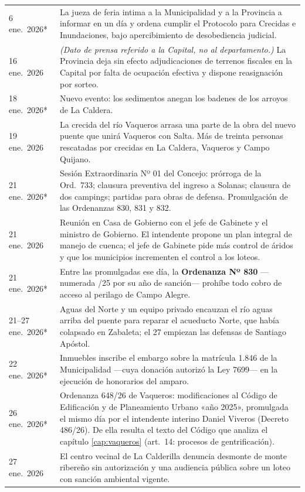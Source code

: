 \begin{longtable}{@{}p{2.7cm}p{10.3cm}@{}}
6 ene.\ 2026* & La jueza de feria intima a la Municipalidad y a la Provincia a informar en un día y ordena cumplir el Protocolo para Crecidas e Inundaciones, bajo apercibimiento de desobediencia judicial. \\
16 ene.\ 2026 & \textit{(Dato de prensa referido a la Capital, no al departamento.)} La Provincia deja sin efecto adjudicaciones de terrenos fiscales en la Capital por falta de ocupación efectiva y dispone reasignación por sorteo. \\
18 ene.\ 2026* & Nuevo evento: los sedimentos anegan los badenes de los arroyos de La Caldera. \\
19 ene.\ 2026 & La crecida del río Vaqueros arrasa una parte de la obra del nuevo puente que unirá Vaqueros con Salta. Más de treinta personas rescatadas por crecidas en La Caldera, Vaqueros y Campo Quijano. \\
21 ene.\ 2026* & Sesión Extraordinaria Nº 01 del Concejo: prórroga de la Ord.\ 733; clausura preventiva del ingreso a Solanas; clausura de dos campings; partidas para obras de defensa. Promulgación de las Ordenanzas 830, 831 y 832. \\
21 ene.\ 2026 & Reunión en Casa de Gobierno con el jefe de Gabinete y el ministro de Gobierno. El intendente propone un plan integral de manejo de cuenca; el jefe de Gabinete pide más control de áridos y que los municipios incrementen el control a los loteos. \\
21 ene.\ 2026* & Entre las promulgadas ese día, la \textbf{Ordenanza Nº 830} ---numerada /25 por su año de sanción--- prohíbe todo cobro de acceso al perilago de Campo Alegre. \\
21--27 ene.\ 2026* & Aguas del Norte y un equipo privado encauzan el río aguas arriba del puente para reparar el acueducto Norte, que había colapsado en Zabaleta; el 27 empiezan las defensas de Santiago Apóstol. \\
22 ene.\ 2026* & Inmuebles inscribe el embargo sobre la matrícula 1.846 de la Municipalidad ---cuya donación autorizó la Ley 7699--- en la ejecución de honorarios del amparo. \\
26 ene.\ 2026* & Ordenanza 648/26 de Vaqueros: modificaciones al Código de Edificación y de Planeamiento Urbano «año 2025», promulgada el mismo día por el intendente interino Daniel Viveros (Decreto 486/26). De ella resulta el texto del Código que analiza el capítulo \ref{cap:vaqueros} (art.\ 14: procesos de gentrificación). \\
27 ene.\ 2026 & El centro vecinal de La Calderilla denuncia desmonte de monte ribereño sin autorización y una audiencia pública sobre un loteo con sanción ambiental vigente. \\

\end{longtable}
